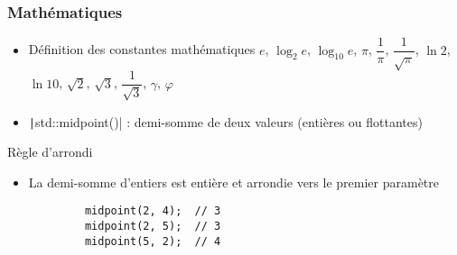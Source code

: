 \documentclass[C++.tex]{subfiles}
\begin{document}
\begin{frame}[fragile]
	\frametitle{Mathématiques}
	\begin{itemize}
		\item Définition des constantes mathématiques $e$, $\log_2 e$, $\log_{10} e$, $\pi$, $\dfrac{1}{\pi}$, $\dfrac{1}{\sqrt{\pi}}$, $\ln{2}$, $\ln{10}$, $\sqrt{2}$, $\sqrt{3}$, $\dfrac{1}{\sqrt{3}}$, $\gamma$, $\varphi$


		\item \texttt|std::midpoint()| : demi-somme de deux valeurs (entières ou flottantes)
	\end{itemize}

	\begin{block}{Règle d'arrondi}
		\begin{itemize}
			\item La demi-somme d'entiers est entière et arrondie vers le premier paramètre
		\end{itemize}

		\begin{verbatim}
			midpoint(2, 4);  // 3
			midpoint(2, 5);  // 3
			midpoint(5, 2);  // 4
		\end{verbatim}
	\end{block}


\end{frame}
\end{document}
